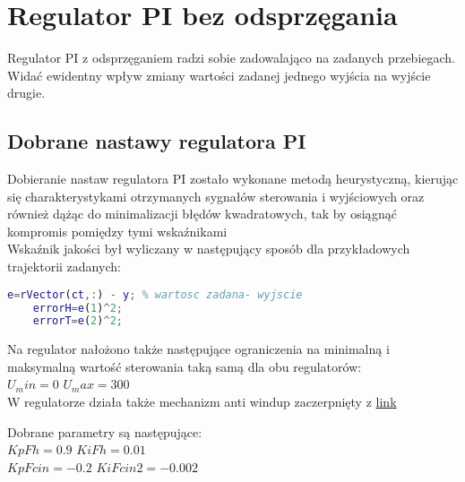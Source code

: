 \section{Regulator PI bez odsprzęgania}
\indent Regulator PI z odsprzęganiem radzi sobie zadowalająco na zadanych przebiegach. Widać ewidentny wpływ zmiany wartości zadanej jednego wyjścia na wyjście drugie.

\subsection{Dobrane nastawy regulatora PI}
\indent Dobieranie nastaw regulatora PI zostało wykonane metodą heurystyczną, kierując się charakterystykami otrzymanych sygnałów sterowania i wyjściowych oraz również dążąc do minimalizacji błędów kwadratowych, tak by osiągnąć kompromis pomiędzy tymi wskaźnikami \\
\indent Wskaźnik jakości był wyliczany w następujący sposób dla przykładowych trajektorii zadanych:
\begin{lstlisting}[language=Matlab]
    e=rVector(ct,:) - y; % wartosc zadana- wyjscie
    errorH=e(1)^2;  
    errorT=e(2)^2;        
\end{lstlisting}

\indent Na regulator nałożono także następujące ograniczenia na minimalną i maksymalną wartość sterowania taką samą dla obu regulatorów:\\
$U_min=0$  $U_max=300$ \\

\indent W regulatorze działa także mechanizm anti windup zaczerpnięty z \href {https://www.mathworks.com/matlabcentral/answers/642205-how-do-i-set-the-saturation-output-for-pid-objects-in-matlab}{link}


\indent Dobrane parametry są następujące: \\
$KpFh=0.9$   $KiFh=0.01$ \\
$KpFcin= -0.2$  $ KiFcin2=-0.002$ \\

